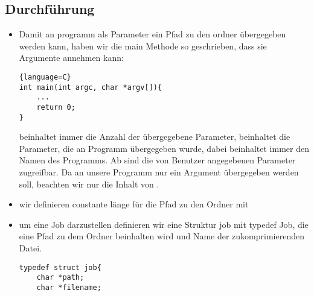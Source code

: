 	\subsection{Durchführung}
\begin{itemize}
	\item Damit an programm als Parameter ein Pfad zu den ordner übergegeben werden kann, haben wir die main
	Methode so geschrieben, dass sie Argumente annehmen kann:
\begin{lstlisting}{language=C}
int main(int argc, char *argv[]){
	...
	return 0;
}
\end{lstlisting}
	 beinhaltet immer die Anzahl der übergegebene Parameter,
	 beinhaltet die Parameter, die an Programm übergegeben wurde,
	dabei  beinhaltet immer den Namen des Programms.
	Ab  sind die von Benutzer angegebenen Parameter zugreifbar.
	Da an unsere Programm nur ein Argument übergegeben werden soll,
	beachten wir nur die Inhalt von .
	\item wir definieren constante länge für die Pfad zu den Ordner mit 
	\item um eine Job darzustellen definieren wir eine Struktur job mit typedef Job,
	die eine Pfad zu dem Ordner beinhalten wird und Name der zukomprimierenden Datei.
	\begin{lstlisting}
typedef struct job{
	char *path;
	char *filename;


\end{lstlisting}
\end{itemize}
